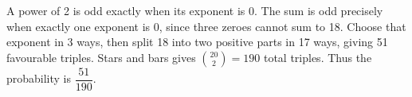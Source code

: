 A power of 2 is odd exactly when its exponent is 0. The sum is odd precisely when exactly one exponent is 0, since three zeroes cannot sum to 18. Choose that exponent in 3 ways, then split 18 into two positive parts in 17 ways, giving 51 favourable triples. Stars and bars gives $\binom{20}{2}=190 $ total triples. Thus the probability is $\boxed{\dfrac{51}{190}}$.
